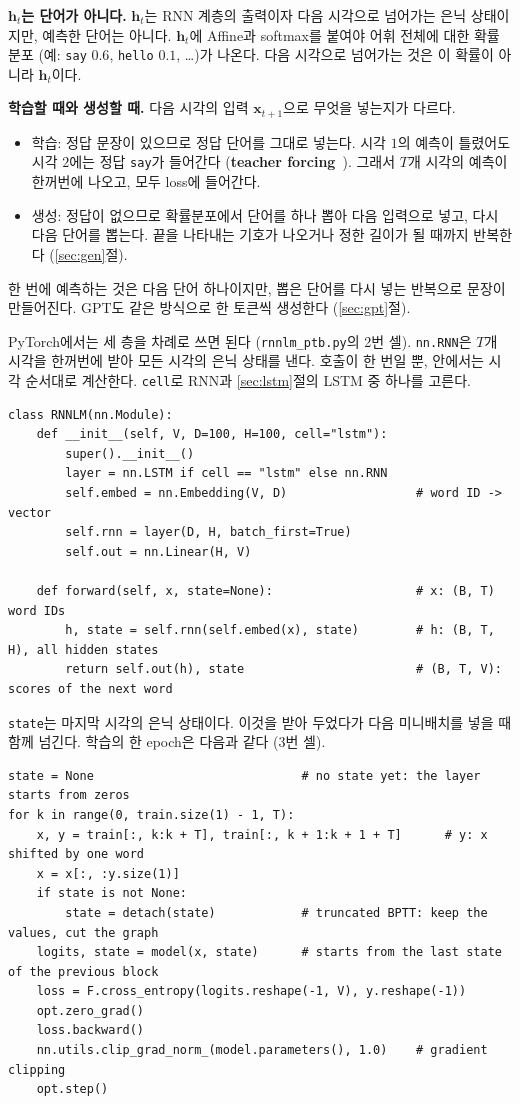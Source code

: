 \documentclass[11pt,a4paper]{article}
\newcommand{\vect}[1]{\bm{#1}}
\newcommand{\w}[1]{\texttt{#1}}
\begin{document}
\textbf{$\vect h_t$는 단어가 아니다.} $\vect h_t$는 RNN 계층의 출력이자 다음 시각으로 넘어가는 은닉 상태이지만, 예측한 단어는 아니다.
$\vect h_t$에 Affine과 softmax를 붙여야 어휘 전체에 대한 확률분포 (예: \w{say} $0.6$, \w{hello} $0.1$, \dots)가 나온다.
다음 시각으로 넘어가는 것은 이 확률이 아니라 $\vect h_t$이다.

\textbf{학습할 때와 생성할 때.} 다음 시각의 입력 $\vect x_{t+1}$으로 무엇을 넣는지가 다르다.
\begin{itemize}[leftmargin=1.5em]
\item 학습: 정답 문장이 있으므로 정답 단어를 그대로 넣는다. 시각 $1$의 예측이 틀렸어도 시각 $2$에는 정답 \w{say}가 들어간다 (\textbf{teacher forcing}~\cite{williams1989}).
그래서 $T$개 시각의 예측이 한꺼번에 나오고, 모두 loss에 들어간다.
\item 생성: 정답이 없으므로 확률분포에서 단어를 하나 뽑아 다음 입력으로 넣고, 다시 다음 단어를 뽑는다.
끝을 나타내는 기호가 나오거나 정한 길이가 될 때까지 반복한다 (\ref{sec:gen}절).
\end{itemize}
한 번에 예측하는 것은 다음 단어 하나이지만, 뽑은 단어를 다시 넣는 반복으로 문장이 만들어진다. GPT도 같은 방식으로 한 토큰씩 생성한다 (\ref{sec:gpt}절).

PyTorch에서는 세 층을 차례로 쓰면 된다 (\texttt{rnnlm\_ptb.py}의 2번 셀). \texttt{nn.RNN}은 $T$개 시각을 한꺼번에 받아 모든 시각의 은닉 상태를 낸다.
호출이 한 번일 뿐, 안에서는 시각 순서대로 계산한다.
\texttt{cell}로 RNN과 \ref{sec:lstm}절의 LSTM 중 하나를 고른다.

\begin{lstlisting}
class RNNLM(nn.Module):
    def __init__(self, V, D=100, H=100, cell="lstm"):
        super().__init__()
        layer = nn.LSTM if cell == "lstm" else nn.RNN
        self.embed = nn.Embedding(V, D)                  # word ID -> vector
        self.rnn = layer(D, H, batch_first=True)
        self.out = nn.Linear(H, V)

    def forward(self, x, state=None):                    # x: (B, T) word IDs
        h, state = self.rnn(self.embed(x), state)        # h: (B, T, H), all hidden states
        return self.out(h), state                        # (B, T, V): scores of the next word
\end{lstlisting}

\texttt{state}는 마지막 시각의 은닉 상태이다. 이것을 받아 두었다가 다음 미니배치를 넣을 때 함께 넘긴다. 학습의 한 epoch은 다음과 같다 (3번 셀).

\begin{lstlisting}
state = None                             # no state yet: the layer starts from zeros
for k in range(0, train.size(1) - 1, T):
    x, y = train[:, k:k + T], train[:, k + 1:k + 1 + T]      # y: x shifted by one word
    x = x[:, :y.size(1)]
    if state is not None:
        state = detach(state)            # truncated BPTT: keep the values, cut the graph
    logits, state = model(x, state)      # starts from the last state of the previous block
    loss = F.cross_entropy(logits.reshape(-1, V), y.reshape(-1))
    opt.zero_grad()
    loss.backward()
    nn.utils.clip_grad_norm_(model.parameters(), 1.0)    # gradient clipping
    opt.step()
\end{lstlisting}
\end{document}
